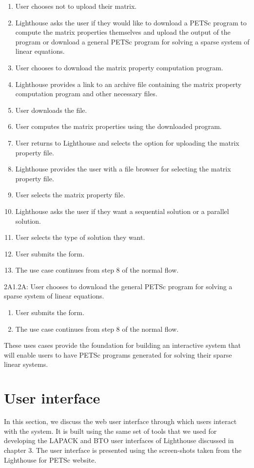\begin{enumerate}
  \item User chooses not to upload their matrix.
  \item Lighthouse asks the user if they would like to download a PETSc program to compute the matrix properties themselves and upload the output of the program or download a general PETSc program for solving a sparse system of linear equations. 
  \item User chooses to download the matrix property computation program.
  \item Lighthouse provides a link to an archive file containing the matrix property computation program and other necessary files.
  \item User downloads the file.
  \item User computes the matrix properties using the downloaded program.
  \item User returns to Lighthouse and selects the option for uploading the matrix property file.
  \item Lighthouse provides the user with a file browser for selecting the matrix property file. 
  \item User selects the matrix property file.
  \item Lighthouse asks the user if they want a sequential solution or a parallel solution. 
  \item User selects the type of solution they want. 
  \item User submits the form. 
  \item The use case continues from step 8 of the normal flow.
\end{enumerate}
2A1.2A: User chooses to download the general PETSc program for solving a sparse system of linear equations.
\begin{enumerate}
  \item User submits the form. 
  \item The use case continues from step 8 of the normal flow.
\end{enumerate}

\noindent These uses cases provide the foundation for building an interactive system that will enable users to have PETSc programs generated for solving their sparse linear systems.

\section{User interface}
In this section, we discuss the web user interface through which users interact with the system. It is built using the same set of tools that we used for developing the LAPACK and BTO user interfaces of Lighthouse discussed in chapter 3. The user interface is presented using the screen-shots taken from the Lighthouse for PETSc website.

